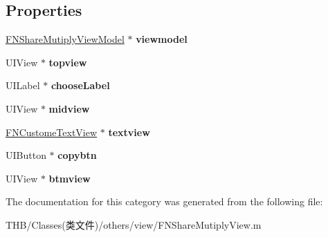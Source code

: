 \subsection*{Properties}
\begin{DoxyCompactItemize}
\item 
\mbox{\label{category_f_n_share_mutiply_view_07_08_aed245451ab806ad8d8306691dd714874}} 
\mbox{\hyperlink{interface_f_n_share_mutiply_view_model}{F\+N\+Share\+Mutiply\+View\+Model}} $\ast$ {\bfseries viewmodel}
\item 
\mbox{\label{category_f_n_share_mutiply_view_07_08_af612559099e4d2591d19e1f804aa1bb7}} 
U\+I\+View $\ast$ {\bfseries topview}
\item 
\mbox{\label{category_f_n_share_mutiply_view_07_08_ab85a9ff5aa3c5883506c6d8f71e05a77}} 
U\+I\+Label $\ast$ {\bfseries choose\+Label}
\item 
\mbox{\label{category_f_n_share_mutiply_view_07_08_a69c63810614a7c5bd2d751ee37567715}} 
U\+I\+View $\ast$ {\bfseries midview}
\item 
\mbox{\label{category_f_n_share_mutiply_view_07_08_a07d71d91907703613485367399aaf456}} 
\mbox{\hyperlink{interface_f_n_custome_text_view}{F\+N\+Custome\+Text\+View}} $\ast$ {\bfseries textview}
\item 
\mbox{\label{category_f_n_share_mutiply_view_07_08_a1d4a71af29302f31c2451ee7f94a2c86}} 
U\+I\+Button $\ast$ {\bfseries copybtn}
\item 
\mbox{\label{category_f_n_share_mutiply_view_07_08_af0ac8f1a0a2a122aed980bca9f27b149}} 
U\+I\+View $\ast$ {\bfseries btmview}
\end{DoxyCompactItemize}


The documentation for this category was generated from the following file\+:\begin{DoxyCompactItemize}
\item 
T\+H\+B/\+Classes(类文件)/others/view/F\+N\+Share\+Mutiply\+View.\+m\end{DoxyCompactItemize}

